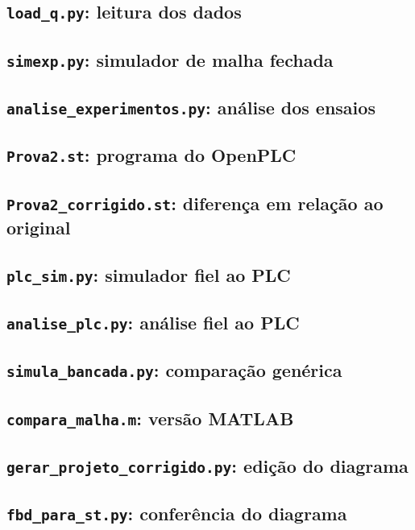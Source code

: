 \subsection{\texttt{load\_q.py}: leitura dos dados}

\subsection{\texttt{simexp.py}: simulador de malha fechada}

\subsection{\texttt{analise\_experimentos.py}: análise dos ensaios}

\subsection{\texttt{Prova2.st}: programa do OpenPLC}

\subsection{\texttt{Prova2\_corrigido.st}: diferença em relação ao original}

\subsection{\texttt{plc\_sim.py}: simulador fiel ao PLC}

\subsection{\texttt{analise\_plc.py}: análise fiel ao PLC}

\subsection{\texttt{simula\_bancada.py}: comparação genérica}

\subsection{\texttt{compara\_malha.m}: versão MATLAB}

\subsection{\texttt{gerar\_projeto\_corrigido.py}: edição do diagrama}

\subsection{\texttt{fbd\_para\_st.py}: conferência do diagrama}

